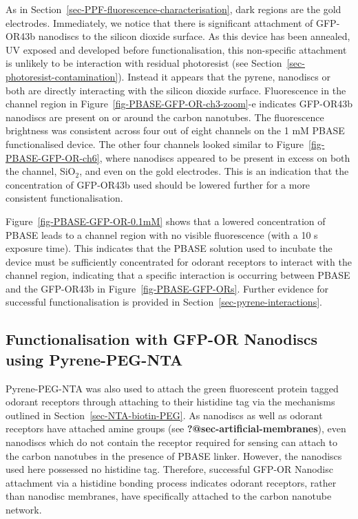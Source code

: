 \documentclass[
  a4paper,
]{scrbook}
\begin{document}
As in Section~\ref{sec-PPF-fluorescence-characterisation}, dark regions
are the gold electrodes. Immediately, we notice that there is
significant attachment of GFP-OR43b nanodiscs to the silicon dioxide
surface. As this device has been annealed, UV exposed and developed
before functionalisation, this non-specific attachment is unlikely to be
interaction with residual photoresist (see
Section~\ref{sec-photoresist-contamination}). Instead it appears that
the pyrene, nanodiscs or both are directly interacting with the silicon
dioxide surface. Fluorescence in the channel region in
Figure~\ref{fig-PBASE-GFP-OR-ch3-zoom}-e indicates GFP-OR43b nanodiscs
are present on or around the carbon nanotubes. The fluorescence
brightness was consistent across four out of eight channels on the 1 mM
PBASE functionalised device. The other four channels looked similar to
Figure~\ref{fig-PBASE-GFP-OR-ch6}, where nanodiscs appeared to be
present in excess on both the channel, SiO\(_2\), and even on the gold
electrodes. This is an indication that the concentration of GFP-OR43b
used should be lowered further for a more consistent functionalisation.

Figure~\ref{fig-PBASE-GFP-OR-0.1mM} shows that a lowered concentration
of PBASE leads to a channel region with no visible fluorescence (with a
10 s exposure time). This indicates that the PBASE solution used to
incubate the device must be sufficiently concentrated for odorant
receptors to interact with the channel region, indicating that a
specific interaction is occurring between PBASE and the GFP-OR43b in
Figure~\ref{fig-PBASE-GFP-ORs}. Further evidence for successful
functionalisation is provided in Section~\ref{sec-pyrene-interactions}.

\hypertarget{sec-NTA-functionalisation}{%
\subsection{Functionalisation with GFP-OR Nanodiscs using
Pyrene-PEG-NTA}\label{sec-NTA-functionalisation}}

Pyrene-PEG-NTA was also used to attach the green fluorescent protein
tagged odorant receptors through attaching to their histidine tag via
the mechanisms outlined in Section~\ref{sec-NTA-biotin-PEG}. As
nanodiscs as well as odorant receptors have attached amine groups (see
\textbf{?@sec-artificial-membranes}), even nanodiscs which do not
contain the receptor required for sensing can attach to the carbon
nanotubes in the presence of PBASE linker. However, the nanodiscs used
here possessed no histidine tag. Therefore, successful GFP-OR Nanodisc
attachment via a histidine bonding process indicates odorant receptors,
rather than nanodisc membranes, have specifically attached to the carbon
nanotube network.
\end{document}
